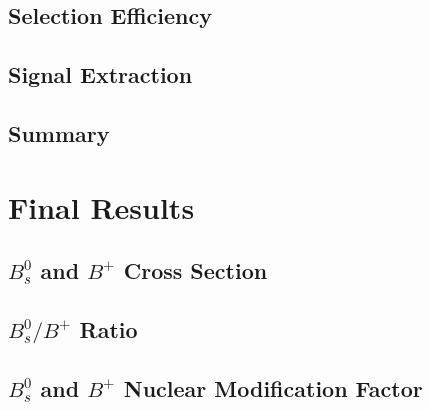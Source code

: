 \subsection{Selection Efficiency}

\subsection{Signal Extraction}

\subsection{Summary}

\section{Final Results} 

\subsection{$B^0_s$ and $B^{+}$ Cross Section}

\subsection{$B^0_s/B^{+}$ Ratio}

\subsection{$B^0_s$ and $B^{+}$ Nuclear Modification Factor}

